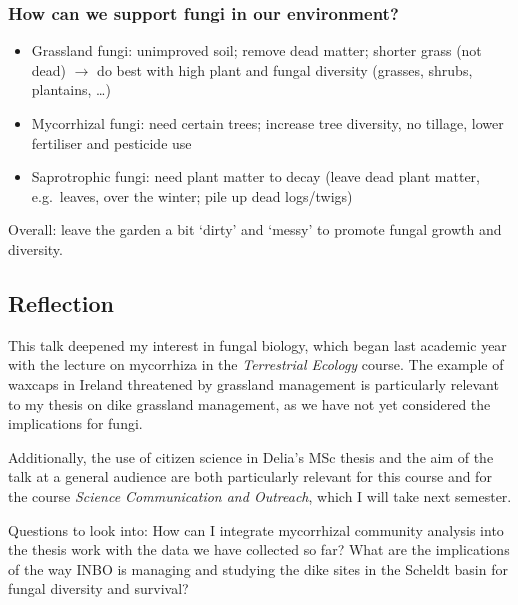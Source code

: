 \subsubsection{How can we support fungi in our environment?}
\begin{itemize}
  \item Grassland fungi: unimproved soil; remove dead matter; shorter grass (not dead) $\rightarrow$ do best with high plant and fungal diversity (grasses, shrubs, plantains, \ldots)
  \item Mycorrhizal fungi: need certain trees; increase tree diversity, no tillage, lower fertiliser and pesticide use
  \item Saprotrophic fungi: need plant matter to decay (leave dead plant matter, e.g.\ leaves, over the winter; pile up dead logs/twigs)
\end{itemize}
Overall: leave the garden a bit `dirty' and `messy' to promote fungal growth and diversity.

\subsection{Reflection}
\begin{callout}
This talk deepened my interest in fungal biology, which began last academic year with the lecture on mycorrhiza in the \textit{Terrestrial Ecology} course. The example of waxcaps in Ireland threatened by grassland management is particularly relevant to my thesis on dike grassland management, as we have not yet considered the implications for fungi.

Additionally, the use of citizen science in Delia's MSc thesis and the aim of the talk at a general audience are both particularly relevant for this course and for the course \textit{Science Communication and Outreach}, which I will take next semester.

Questions to look into: How can I integrate mycorrhizal community analysis into the thesis work with the data we have collected so far? What are the implications of the way INBO is managing and studying the dike sites in the Scheldt basin for fungal diversity and survival?
\end{callout}
